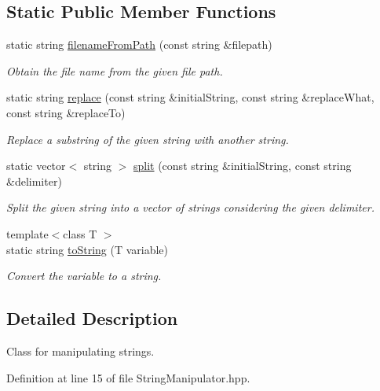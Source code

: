 \subsection*{Static Public Member Functions}
\begin{DoxyCompactItemize}
\item 
static string \hyperlink{classmultiscale_1_1StringManipulator_ab0354ab5ca48df4394695445fe105640}{filename\-From\-Path} (const string \&filepath)
\begin{DoxyCompactList}\small\item\em Obtain the file name from the given file path. \end{DoxyCompactList}\item 
static string \hyperlink{classmultiscale_1_1StringManipulator_afe65f4f4cdf70976df2a8749b9e2fc7b}{replace} (const string \&initial\-String, const string \&replace\-What, const string \&replace\-To)
\begin{DoxyCompactList}\small\item\em Replace a substring of the given string with another string. \end{DoxyCompactList}\item 
static vector$<$ string $>$ \hyperlink{classmultiscale_1_1StringManipulator_a899c72a05bbd8fb525f31bca3c1ec3c4}{split} (const string \&initial\-String, const string \&delimiter)
\begin{DoxyCompactList}\small\item\em Split the given string into a vector of strings considering the given delimiter. \end{DoxyCompactList}\item 
{\footnotesize template$<$class T $>$ }\\static string \hyperlink{classmultiscale_1_1StringManipulator_a91858c4faa5ee210a9b67e4885835368}{to\-String} (T variable)
\begin{DoxyCompactList}\small\item\em Convert the variable to a string. \end{DoxyCompactList}\end{DoxyCompactItemize}


\subsection{Detailed Description}
Class for manipulating strings. 

Definition at line 15 of file String\-Manipulator.\-hpp.



